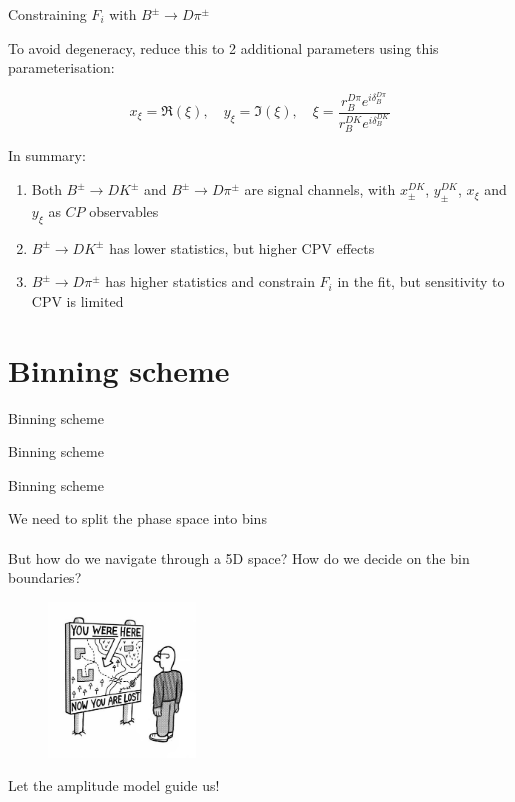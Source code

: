 \documentclass{beamer}
\begin{document}
\begin{frame}{Constraining $F_i$ with $B^\pm\to D\pi^\pm$}
  \begin{center}
    To avoid degeneracy, reduce this to 2 additional parameters using this parameterisation:
  \end{center}
  \begin{equation*}
    x_\xi = \Re(\xi),\quad y_\xi = \Im(\xi),\quad \xi = \frac{r_B^{D\pi}e^{i\delta_B^{D\pi}}}{r_B^{DK}e^{i\delta_B^{DK}}}
  \end{equation*}
  \begin{center}
    In summary:
  \end{center}
  \begin{enumerate}
    \setlength\itemsep{1.0em}
    \item{Both $B^\pm\to DK^\pm$ and $B^\pm\to D\pi^\pm$ are signal channels, with $x_\pm^{DK}$, $y_\pm^{DK}$, $x_\xi$ and $y_\xi$ as $C\!P$ observables}
    \item{$B^\pm\to DK^\pm$ has lower statistics, but higher CPV effects}
    \item{$B^\pm\to D\pi^\pm$ has higher statistics and constrain $F_i$ in the fit, but sensitivity to CPV is limited}
  \end{enumerate}
\end{frame}

\section{Binning scheme}
\begin{frame}{Binning scheme}
  \begin{center}
    {\huge Binning scheme}
  \end{center}
\end{frame}

\begin{frame}{Binning scheme}
  \begin{center}
    \Large We need to split the phase space into bins\\~\\
    \large But how do we navigate through a 5D space? How do we decide on the bin boundaries?
  \end{center}
  \vspace{-0.5cm}
  \begin{figure}
    \centering
    \includegraphics[width = 0.35\textwidth]{Plots/TravelLost.jpeg}
  \end{figure}
  \vspace{-0.7cm}
  \begin{center}
    \Large Let the amplitude model guide us!
  \end{center}
\end{frame}
\end{document}
